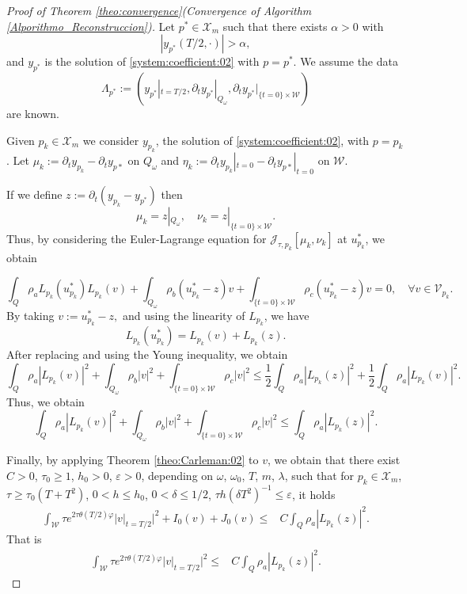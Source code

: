 \documentclass{amsart}
\numberwithin{equation}{section}
\begin{document}
\begin{proof}[Proof of Theorem \ref{theo:convergence}(Convergence of Algorithm \eqref{Alporithmo_Reconstruccion})]
    Let $p^\ast\in \mathcal{X}_{m}$ such that there exists $\alpha>0$ with
$$|y_{p^{\ast}}(T/2,\cdot)|>\alpha,$$ and $y_{p^\ast}$ is the solution of \eqref{system:coefficient:02} with $p=p^\ast$. We assume the data 
$$\Lambda_{p^\ast}:= (y_{p^\ast}|_{t=T/2},\partial_ty_{p^\ast}|_{Q_{\omega}},\partial_ty_{p^\ast}|_{\{t=0\}\times\mathcal{W}})$$
are known.

Given $p_k\in \mathcal{X}_{m}$ we consider $y_{p_k}$, the solution of \eqref{system:coefficient:02}, with $p=p_k$. Let $\mu_k:= \partial_ty_{p_k}-\partial_ty_{p*}$ on $Q_\omega$ and $\eta_k:= \partial_ty_{p_k}|_{t=0}-\partial_ty_{p*}|_{t=0}$ on $\mathcal{W}$.

If we define $z:= \partial_t(y_{p_k}-y_{p^\ast})$ then 
$$\mu_k=z|_{Q_{\omega}},\quad \nu_k=z|_{\{t=0\}\times \mathcal{W}}.$$
Thus, by considering the Euler-Lagrange equation for $\mathcal{J}_{\tau,p_k}[\mu_k,\nu_k]$ at $u^\ast_{p_k}$, we obtain  

$$\int_Q\rho_a L_{p_k}(u^\ast_{p_k})L_{p_k}(v)+\int_{Q_\omega}\rho_b(u^\ast_{p_k}-z)v +\int_{\{t=0\}\times\mathcal{W}}\rho_c(u^\ast_{p_k}-z)v=0,\quad \forall v\in \mathcal{V}_{p_k}.
$$
By taking $v:= u^\ast_{p_k}-z,$ and using the linearity of $L_{p_k}$, we have $$L_{p_k}(u^\ast_{p_k})=L_{p_k}(v)+L_{p_k}(z).$$
After replacing and using the Young inequality, we obtain 
$$\int_Q\rho_a |L_{p_k}(v)|^2+\int_{Q_\omega}\rho_b|v|^2 +\int_{\{t=0\}\times\mathcal{W}}\rho_c|v|^2
\leq \frac{1}{2}\int_Q\rho_a |L_{p_k}(z)|^2+\frac{1}{2}\int_Q\rho_a |L_{p_k}(v)|^2.
$$
Thus, we obtain 
$$\int_Q\rho_a |L_{p_k}(v)|^2+\int_{Q_\omega}\rho_b|v|^2 +\int_{\{t=0\}\times\mathcal{W}}\rho_c|v|^2
\leq \int_Q\rho_a |L_{p_k}(z)|^2.
$$

Finally, by applying Theorem \ref{theo:Carleman:02} to $v$, we obtain that there exist $C>0$, $\tau_{0}\geq 1$, $h_{0}>0$, $\varepsilon >0$, depending on $\omega$, $\omega_{0}$, $T$, $m$,  $\lambda$, such that for $p_k\in \mathcal{X}_{m}$, $\tau\geq \tau_{0}(T+T^{2})$, $0<h\leq h_{0}$, $0<\delta \leq 1/2$, $\tau h(\delta T^{2})^{-1}\leq \varepsilon$, it holds
\begin{align*}
		\int_{\mathcal{W}}\tau e^{2\tau\theta(T/2)\varphi}\Big|v|_{t=T/2}\Big|^2+I_{0}(v)+J_{0}(v) 
		\leq&  C\int_Q\rho_a |L_{p_k}(z)|^2.
	\end{align*}
That is    \begin{align}\label{eq:theo:final:02}
		\int_{\mathcal{W}}\tau e^{2\tau\theta(T/2)\varphi}\Big|v|_{t=T/2}\Big|^2
		\leq&  C\int_Q\rho_a |L_{p_k}(z)|^2.
	\end{align}


\end{proof}
\end{document}
